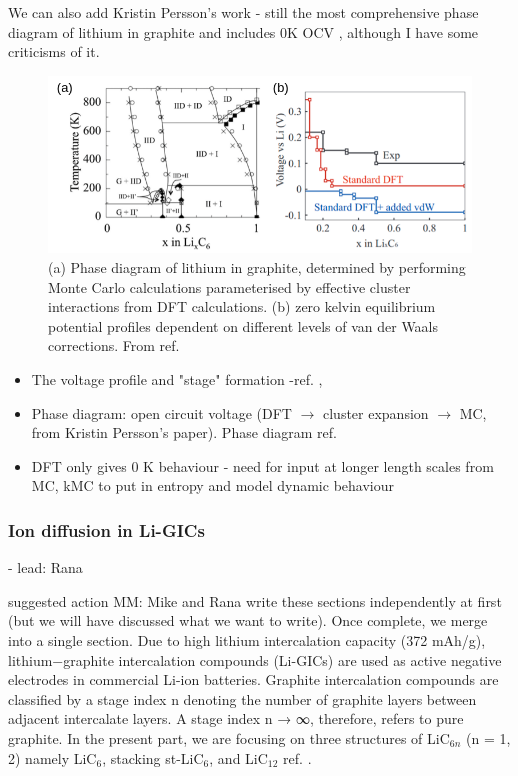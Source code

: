 \documentclass[journal=jacsat,manuscript=article]{achemso}
\begin{document}
We can also add Kristin Persson's work - still the most comprehensive phase diagram of lithium in graphite and includes 0K OCV , although I have some criticisms of it. 

    \begin{figure}
    \centering
    \includegraphics[scale=2]{figures/perrson_phasediagram.png}
    \caption{(a) Phase diagram of lithium in graphite, determined by performing Monte Carlo calculations parameterised by effective cluster interactions from DFT calculations. (b) zero kelvin equilibrium potential profiles dependent on different levels of van der Waals corrections. From ref. }
    \label{fig:persson_graphitephases}
\end{figure}

\begin{itemize}
    \item The voltage profile and "stage" formation
    -ref. ,
    \item Phase diagram:  open circuit voltage (DFT $\rightarrow$ cluster expansion $\rightarrow$ MC, from Kristin Persson's paper). Phase diagram ref. 
    \item DFT only gives 0 K behaviour - need for input at longer length scales from MC, kMC to put in entropy and model dynamic behaviour
\end{itemize}

\subsubsection{Ion diffusion in Li-GICs} 
\label{sec:anodes_ion_diffusion}
- lead: Rana

suggested action MM: Mike and Rana write these sections independently at first (but we will have discussed what we want to write). Once complete, we merge into a single section.
Due to high lithium intercalation capacity (372 mAh/g), lithium−graphite intercalation compounds (Li-GICs) are used as active negative electrodes in commercial Li-ion batteries. Graphite intercalation compounds are classified by a stage index n denoting the number of graphite layers between adjacent intercalate layers. A stage index n → ∞, therefore, refers to pure graphite. In the present part, we are focusing on three structures of LiC$_{6n}$ (n = 1, 2) namely LiC$_6$, stacking st-LiC$_6$, and LiC$_{12}$ ref. . 
\end{document}

